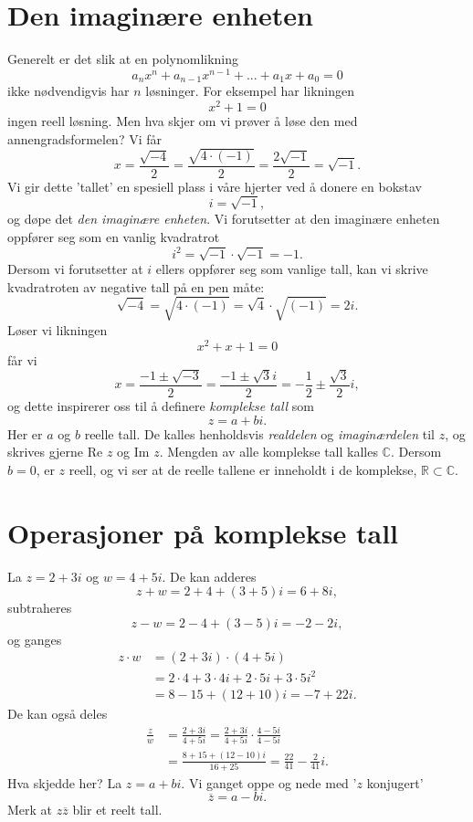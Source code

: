 

\label{ch:komplekse-tall}
\section*{Den imaginære enheten}
Generelt er det slik at en polynomlikning
\[
a_nx^n+a_{n-1}x^{n-1}+...+a_1x+a_0=0
\]
ikke nødvendigvis har $n$ løsninger. For eksempel har likningen 
\[
x^2+1=0
\]
ingen reell løsning. Men hva skjer om vi prøver å løse den med annengradsformelen? Vi får
\[
x=\frac{\sqrt{-4}}{2}=\frac{\sqrt{4\cdot (-1)}}{2}=\frac{2\sqrt{-1}}{2}=\sqrt{-1}.
\]
Vi gir dette 'tallet' en spesiell plass i våre hjerter ved å donere en bokstav
\[
i=\sqrt{-1},
\]
og døpe det \emph{den imaginære enheten}. Vi forutsetter at den imaginære enheten oppfører seg som en vanlig kvadratrot
\[
i^2=\sqrt{-1}\cdot\sqrt{-1}=-1.
\]
Dersom vi forutsetter at $i$ ellers oppfører seg som vanlige tall, kan vi skrive kvadratroten av negative tall på en pen måte:
\begin{equation*}
\sqrt{-4}=\sqrt{4\cdot (-1)}=\sqrt{4}\cdot \sqrt{(-1)}=2i.
\end{equation*}
Løser vi likningen
\[
x^2+x+1=0
\]
får vi 
\[
x=\frac{-1\pm \sqrt{-3}}{2}=\frac{-1\pm \sqrt{3}i}{2}=-\frac{1}{2}\pm\frac{\sqrt{3}}{2}i,
\]
og dette inspirerer oss til å definere \emph{komplekse tall} som 
\[
z=a+bi.
\]
Her er $a$ og $b$ reelle tall. De kalles henholdsvis \emph{realdelen} og \emph{imaginærdelen} til $z$, og skrives gjerne Re $z$ og Im $z$. Mengden av alle komplekse tall kalles $\mathbb C$. Dersom $b=0$, er $z$ reell, og vi ser at de reelle tallene er inneholdt i de komplekse, $\mathbb R \subset \mathbb C$.


\section*{Operasjoner på komplekse tall}
La $z=2+3i$ og $w=4+5i$. De kan adderes
\[
z+w=2+4+(3+5)i=6+8i,
\]
subtraheres
\[
z-w=2-4+(3-5)i=-2-2i,
\]
og ganges 
\begin{align*}
z\cdot w&=(2+3i)\cdot(4+5i)\\&=2\cdot 4+3\cdot 4i+2\cdot 5i+3\cdot 5 i^2\\&=8-15+(12+10)i=-7+22i.
\end{align*}
De kan også deles
\begin{align*}
\frac{z}{w}&=\frac{2+3i}{4+5i}=\frac{2+3i}{4+5i}\cdot\frac{4-5i}{4-5i}\\&=\frac{8+15+(12-10)i}{16+25}=\frac{22}{41}-\frac{2}{41}i.
\end{align*}
Hva skjedde her? La $z=a+bi$. Vi ganget oppe og nede med '$z$ konjugert'
\[
\overline z =a-bi.
\]
Merk at $z\overline z$ blir et reelt tall. 



